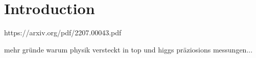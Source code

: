\chapter{Introduction}


https://arxiv.org/pdf/2207.00043.pdf

mehr gründe warum physik versteckt in top und higgs präziosions messungen... 